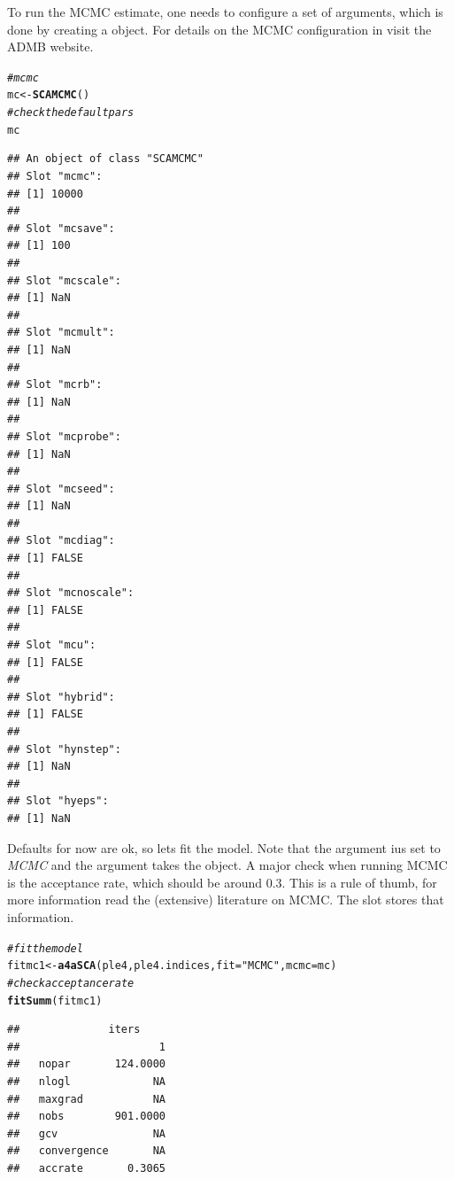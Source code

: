 \documentclass[a4paper,english,10pt]{article}\usepackage[]{graphicx}\usepackage[]{color}
\makeatletter
\newcommand{\hlstr}[1]{\textcolor[rgb]{0.192,0.494,0.8}{#1}}%
\newcommand{\hlcom}[1]{\textcolor[rgb]{0.678,0.584,0.686}{\textit{#1}}}%
\newcommand{\hlstd}[1]{\textcolor[rgb]{0.345,0.345,0.345}{#1}}%
\newcommand{\hlkwb}[1]{\textcolor[rgb]{0.69,0.353,0.396}{#1}}%
\newcommand{\hlkwc}[1]{\textcolor[rgb]{0.333,0.667,0.333}{#1}}%
\newcommand{\hlkwd}[1]{\textcolor[rgb]{0.737,0.353,0.396}{\textbf{#1}}}%
\newenvironment{kframe}{%
 \def\at@end@of@kframe{}%
 \ifinner\ifhmode%
  \def\at@end@of@kframe{\end{minipage}}%
  \begin{minipage}{\columnwidth}%
 \fi\fi%
 \def\FrameCommand##1{\hskip\@totalleftmargin \hskip-\fboxsep
 \colorbox{shadecolor}{##1}\hskip-\fboxsep
     \hskip-\linewidth \hskip-\@totalleftmargin \hskip\columnwidth}%
 \MakeFramed {\advance\hsize-\width
   \@totalleftmargin\z@ \linewidth\hsize
   \@setminipage}}%
 {\par\unskip\endMakeFramed%
 \at@end@of@kframe}
\newenvironment{knitrout}{}{} %
\makeatother
\begin{document}
To run the MCMC estimate, one needs to configure a set of arguments, which is done by creating a  object. For details on the MCMC configuration in  visit the ADMB website.

\begin{knitrout}
\color{fgcolor}\begin{kframe}
\begin{alltt}
\hlcom{# mcmc}
\hlstd{mc} \hlkwb{<-} \hlkwd{SCAMCMC}\hlstd{()}
\hlcom{# check the default pars}
\hlstd{mc}
\end{alltt}
\begin{verbatim}
## An object of class "SCAMCMC"
## Slot "mcmc":
## [1] 10000
## 
## Slot "mcsave":
## [1] 100
## 
## Slot "mcscale":
## [1] NaN
## 
## Slot "mcmult":
## [1] NaN
## 
## Slot "mcrb":
## [1] NaN
## 
## Slot "mcprobe":
## [1] NaN
## 
## Slot "mcseed":
## [1] NaN
## 
## Slot "mcdiag":
## [1] FALSE
## 
## Slot "mcnoscale":
## [1] FALSE
## 
## Slot "mcu":
## [1] FALSE
## 
## Slot "hybrid":
## [1] FALSE
## 
## Slot "hynstep":
## [1] NaN
## 
## Slot "hyeps":
## [1] NaN
\end{verbatim}
\end{kframe}
\end{knitrout}

Defaults for now are ok, so lets fit the model. Note that the argument  ius set to \emph{MCMC} and the argument  takes the  object. A major check when running MCMC is the acceptance rate, which should be around 0.3. This is a rule of thumb, for more information read the (extensive) literature on MCMC. The slot  stores that information.  

\begin{knitrout}
\color{fgcolor}\begin{kframe}
\begin{alltt}
\hlcom{# fit the model}
\hlstd{fitmc1} \hlkwb{<-} \hlkwd{a4aSCA}\hlstd{(ple4, ple4.indices,} \hlkwc{fit} \hlstd{=} \hlstr{"MCMC"}\hlstd{,} \hlkwc{mcmc} \hlstd{= mc)}
\hlcom{# check acceptance rate}
\hlkwd{fitSumm}\hlstd{(fitmc1)}
\end{alltt}
\begin{verbatim}
##              iters
##                      1
##   nopar       124.0000
##   nlogl             NA
##   maxgrad           NA
##   nobs        901.0000
##   gcv               NA
##   convergence       NA
##   accrate       0.3065
\end{verbatim}
\end{kframe}
\end{knitrout}
\end{document}
